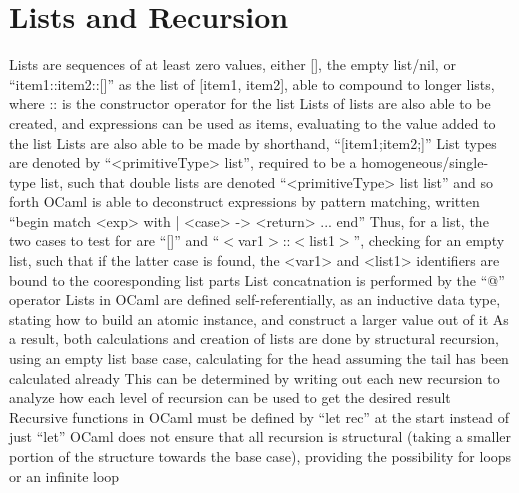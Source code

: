 \documentclass[11 pt, twoside]{article}
\newenvironment{outline*}
{
	\begin{outline}[enumerate]
	}
	{\end{outline}
}
\begin{document}
\section{Lists and Recursion}
\begin{outline*}
\1 Lists are sequences of at least zero values, either [], the empty list/nil, or ``item1::item2::[]'' as the list of [item1, item2], able to compound to longer lists, where :: is the constructor operator for the list
\2 Lists of lists are also able to be created, and expressions can be used as items, evaluating to the value added to the list
\2 Lists are also able to be made by shorthand, ``[item1;item2;]''
\2 List types are denoted by ``<primitiveType> list'', required to be a homogeneous/single-type list, such that double lists are denoted ``<primitiveType> list list'' and so forth
\2 OCaml is able to deconstruct expressions by pattern matching, written ``begin match <exp> with | <case> -> <return> ... end''
\3 Thus, for a list, the two cases to test for are ``[]'' and ``$<$var1$>$::$<$list1$>$'', checking for an empty list, such that if the latter case is found, the <var1> and <list1> identifiers are bound to the cooresponding list parts
\2 List concatnation is performed by the ``@'' operator
\1 Lists in OCaml are defined self-referentially, as an inductive data type, stating how to build an atomic instance, and construct a larger value out of it
\2 As a result, both calculations and creation of lists are done by structural recursion, using an empty list base case, calculating for the head assuming the tail has been calculated already
\3 This can be determined by writing out each new recursion to analyze how each level of recursion can be used to get the desired result
\2 Recursive functions in OCaml must be defined by ``let rec'' at the start instead of just ``let''
\2 OCaml does not ensure that all recursion is structural (taking a smaller portion of the structure towards the base case), providing the possibility for loops or an infinite loop
\end{outline*}
\end{document}
